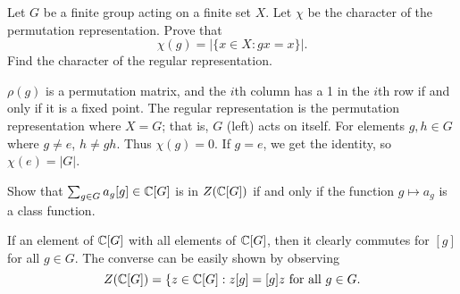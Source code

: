 
\question Let $G$ be a finite group acting on a finite set $X$. Let $\chi$ be the character of the permutation representation. Prove that
\[ \chi(g) = \lvert\{x \in X: gx = x\}\rvert. \]
Find the character of the regular representation. 
\begin{solution}
     $\rho(g)$ is a permutation matrix, and the $i$th column has a 1 in the $i$th row if and only if it is a fixed point. The regular representation is the permutation representation where $X = G$; that is, $G$ (left) acts on itself. For elements $g,h \in G$ where $g \neq e$, $h \neq gh$. Thus $\chi(g) = 0$. If $g = e$, we get the identity, so $\chi(e) = \lvert G \rvert$. 
\end{solution}

\question Show that $\sum_{g \in G} a_g[g] \in \mathbb C[G]$ is in $Z(\mathbb C[G])$ if and only if the function $g \mapsto a_g$ is a class function.   
\begin{solution}
    If an element of $\mathbb C[G]$ with all elements of $\mathbb C[G]$, then it clearly commutes for $[g]$ for all $g \in G$. The converse can be easily shown by observing
    \[ Z(\mathbb C[G]) = \{z \in \mathbb C[G]: \text{$z[g] = [g]z$ for all $g \in G$}. \]
\end{solution}

